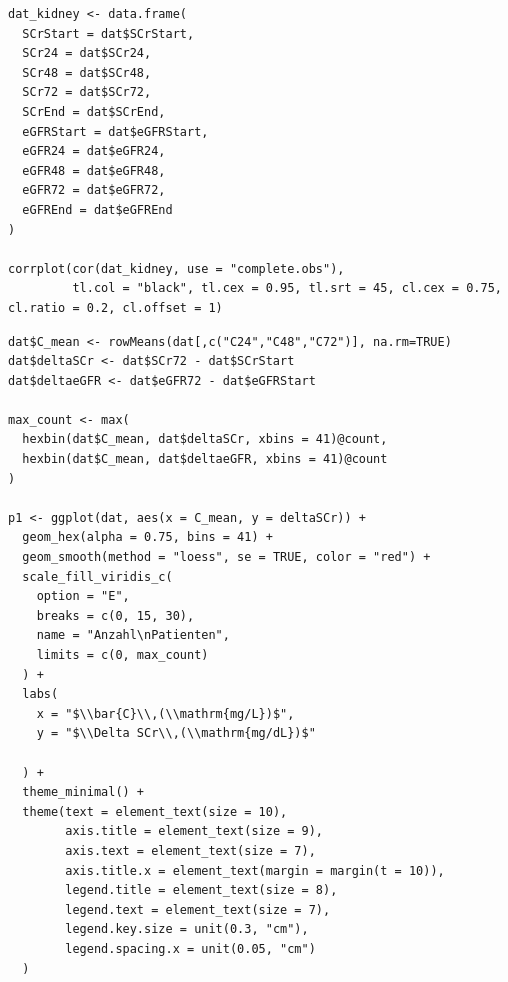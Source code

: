 \documentclass[a4paper,12pt]{article}
\begin{document}
\begin{lstlisting}[caption={Code für Abbildung \ref{fig:abb2}}, label = lst:abb2, style=mystyle, escapeinside=``]
dat_kidney <- data.frame(
  SCrStart = dat$SCrStart,
  SCr24 = dat$SCr24,
  SCr48 = dat$SCr48,
  SCr72 = dat$SCr72,
  SCrEnd = dat$SCrEnd,
  eGFRStart = dat$eGFRStart,
  eGFR24 = dat$eGFR24,
  eGFR48 = dat$eGFR48,
  eGFR72 = dat$eGFR72,
  eGFREnd = dat$eGFREnd
)

corrplot(cor(dat_kidney, use = "complete.obs"),
         tl.col = "black", tl.cex = 0.95, tl.srt = 45, cl.cex = 0.75, cl.ratio = 0.2, cl.offset = 1)
\end{lstlisting}

\begin{lstlisting}[caption={Code für Abbildung \ref{fig:abb3}}, label = lst:abb3, style=mystyle, escapeinside=``]
dat$C_mean <- rowMeans(dat[,c("C24","C48","C72")], na.rm=TRUE)
dat$deltaSCr <- dat$SCr72 - dat$SCrStart
dat$deltaeGFR <- dat$eGFR72 - dat$eGFRStart

max_count <- max(
  hexbin(dat$C_mean, dat$deltaSCr, xbins = 41)@count,
  hexbin(dat$C_mean, dat$deltaeGFR, xbins = 41)@count
)

p1 <- ggplot(dat, aes(x = C_mean, y = deltaSCr)) +
  geom_hex(alpha = 0.75, bins = 41) +
  geom_smooth(method = "loess", se = TRUE, color = "red") +
  scale_fill_viridis_c(
    option = "E",
    breaks = c(0, 15, 30),
    name = "Anzahl\nPatienten",
    limits = c(0, max_count)
  ) +
  labs(
    x = "$\\bar{C}\\,(\\mathrm{mg/L})$",
    y = "$\\Delta SCr\\,(\\mathrm{mg/dL})$"
    
  ) +
  theme_minimal() +
  theme(text = element_text(size = 10),
        axis.title = element_text(size = 9),
        axis.text = element_text(size = 7),
        axis.title.x = element_text(margin = margin(t = 10)),
        legend.title = element_text(size = 8),
        legend.text = element_text(size = 7),
        legend.key.size = unit(0.3, "cm"),
        legend.spacing.x = unit(0.05, "cm")
  )


\end{lstlisting}
\end{document}
